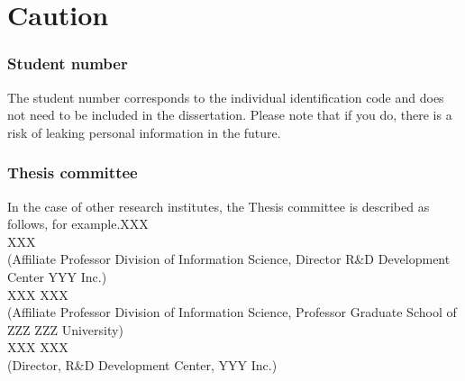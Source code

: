\chapter{Caution}
\subsection{Student number}
The student number corresponds to the individual identification code and does not need to be included in the dissertation. Please note that if you do, there is a risk of leaking personal information in the future.

\subsection{Thesis committee}
In the case of other research institutes, the Thesis committee is described as follows, for example.XXX \\
XXX \\
(Affiliate Professor Division of Information Science, Director R\&D Development Center YYY Inc.) \\
XXX XXX \\
(Affiliate Professor Division of Information Science, Professor Graduate School of ZZZ ZZZ University) \\
XXX XXX \\
(Director, R\&D Development Center, YYY Inc.)

